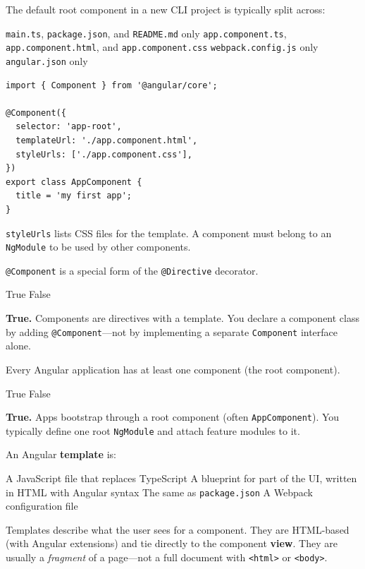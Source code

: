 \question[4]
The default root component in a new CLI project is typically split across:
\begin{choices}
  \choice \texttt{main.ts}, \texttt{package.json}, and \texttt{README.md} only
  \CorrectChoice \texttt{app.component.ts}, \texttt{app.component.html}, and \texttt{app.component.css}
  \choice \texttt{webpack.config.js} only
  \choice \texttt{angular.json} only
\end{choices}
\begin{solution}
\begin{lstlisting}[style=ts]
import { Component } from '@angular/core';

@Component({
  selector: 'app-root',
  templateUrl: './app.component.html',
  styleUrls: ['./app.component.css'],
})
export class AppComponent {
  title = 'my first app';
}
\end{lstlisting}
  \texttt{styleUrls} lists CSS files for the template. A component must belong to an \texttt{NgModule} to be used by other components.
\end{solution}

\question[4]
\texttt{@Component} is a special form of the \texttt{@Directive} decorator.
\begin{choices}
  \CorrectChoice True
  \choice False
\end{choices}
\begin{solution}
  \textbf{True.} Components are directives with a template. You declare a component class by adding \texttt{@Component}---not by implementing a separate \texttt{Component} interface alone.
\end{solution}

\question[4]
Every Angular application has at least one component (the root component).
\begin{choices}
  \CorrectChoice True
  \choice False
\end{choices}
\begin{solution}
  \textbf{True.} Apps bootstrap through a root component (often \texttt{AppComponent}). You typically define one root \texttt{NgModule} and attach feature modules to it.
\end{solution}

\question[4]
An Angular \textbf{template} is:
\begin{choices}
  \choice A JavaScript file that replaces TypeScript
  \CorrectChoice A blueprint for part of the UI, written in HTML with Angular syntax
  \choice The same as \texttt{package.json}
  \choice A Webpack configuration file
\end{choices}
\begin{solution}
  Templates describe what the user sees for a component. They are HTML-based (with Angular extensions) and tie directly to the component \textbf{view}. They are usually a \emph{fragment} of a page---not a full document with \lstinline[style=htmlinline]{<html>} or \lstinline[style=htmlinline]{<body>}.
\end{solution}

